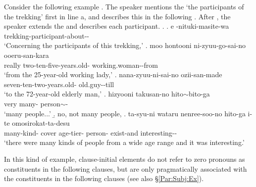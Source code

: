 Consider the following example \Next.
The speaker mentions the  `the participants of the trekking' first in line a,
and describes this in the following .
After \Next[f],
the speaker extends the  and describes each participant.
%
\ex.\label{trekking}
 \ag. e -nituki-masite-wa \\
 	 trekking-participant-about-- \\
	`Concerning the participants of this trekking,'
 \bg. moo hontooni ni-zyuu-go-sai-no ooeru-san-kara \\
 	 really two-ten-five-years.old- working.woman--from \\
	`from the 25-year-old working lady,'
 \bg. nana-zyuu-ni-sai-no ozii-san-made \\
 	seven-ten-two-years.old- old.guy--till \\
	`to the 72-year-old elderly man,'
 \bg. hizyooni takusan-no hito$\sim$bito-ga \\
 	very many- person$\sim$- \\
	`many people...'
 \b. no, not many people,
 \bg. ta-syu-ni wataru nenree-soo-no hito-ga i-te omosirokat-ta-desu \\
 		many-kind- cover age-tier- person- exist-and interesting-- \\
		`there were many kinds of people from a wide age range and it was interesting.'

In this kind of example,
clause-initial elements do not refer to zero pronouns as constituents in the following clauses,
but are only pragmatically associated with the constituents in the following clauses (see also \S \ref{Par:Subj:Ex}).


